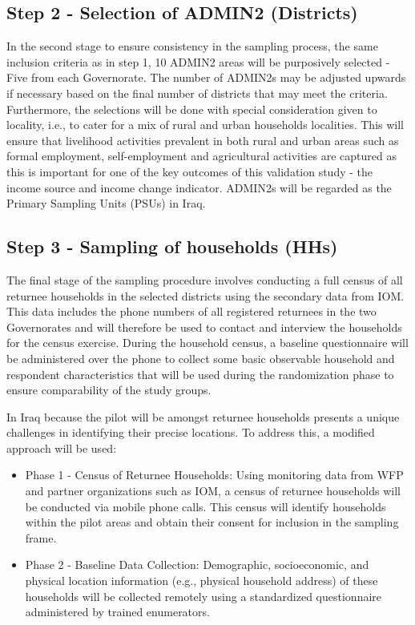 \documentclass[11pt,harvard]{article}
\begin{document}
	\subsection{Step 2 - Selection of ADMIN2 (Districts) }
	In the second stage to ensure consistency in the sampling process, the same inclusion criteria as in step 1, 10 ADMIN2 areas will be purposively selected - Five from each Governorate. The number of ADMIN2s may be adjusted upwards if necessary based on the final number of districts that may meet the criteria. Furthermore, the selections will be done with special consideration given to locality, i.e., to cater for a mix of rural and urban households localities. This will ensure that livelihood activities prevalent in both rural and urban areas such as formal employment, self-employment and agricultural activities are captured as this is important for one of the key outcomes of this validation study - the income source and income change indicator.
	ADMIN2s will be regarded as the Primary Sampling Units (PSUs) in Iraq.
	
	\subsection{Step 3 - Sampling of households (HHs)}
	The final stage of the sampling procedure involves conducting a full census of all returnee households in the selected districts using the secondary data from IOM. This data includes the phone numbers of all registered returnees in the two Governorates and will therefore be used to contact and interview the households for the census exercise. During the household census, a baseline questionnaire will be administered over the phone to collect some basic observable household and respondent characteristics that will be used during the randomization phase to ensure comparability of the study groups. 
	
	In Iraq because the pilot will be amongst returnee households presents a unique challenges in identifying their precise locations. To address this, a modified approach will be used:
	\begin{itemize}
		\item Phase 1 - Census of Returnee Households:
		Using monitoring data from WFP and partner organizations such as IOM, a census of returnee households will be conducted via mobile phone calls. This census will identify households within the pilot areas and obtain their consent for inclusion in the sampling frame.
		\item Phase 2 - Baseline Data Collection:
		Demographic, socioeconomic, and physical location information (e.g., physical household address) of these households will be collected remotely using a standardized questionnaire administered by trained enumerators.
	\end{itemize}
	
\end{document}
